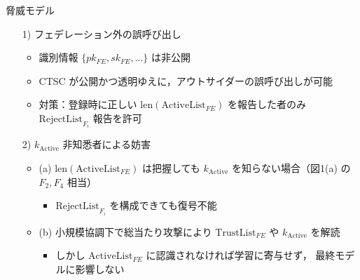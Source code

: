 \documentclass[unicode,12pt,aspectratio=169, dvipdfmx]{beamer}
\begin{document}
  \begin{frame}{脅威モデル}
    \begin{itemize}
      \item[1)] フェデレーション外の誤呼び出し
        \begin{itemize}
          \item 識別情報 \(\{pk_{FE},sk_{FE},\dots\}\) は非公開
          \item CTSC が公開かつ透明ゆえに，アウトサイダーの誤呼び出しが可能
          \item 対策：登録時に正しい \(\mathrm{len}(\mathrm{ActiveList}_{FE})\) を報告した者のみ
            \(\mathrm{RejectList}_{F_i}\) 報告を許可
        \end{itemize}
      \item[2)] \(k_{\mathrm{Active}}\) 非知悉者による妨害
        \begin{itemize}
          \item (a) \(\mathrm{len}(\mathrm{ActiveList}_{FE})\) は把握しても
            \(k_{\mathrm{Active}}\) を知らない場合（図1(a) の \(F_2,F_4\) 相当）
            \begin{itemize}
              \item \(\mathrm{RejectList}_{F_i}\) を構成できても復号不能
            \end{itemize}
          \item (b) 小規模協調下で総当たり攻撃により
            \(\mathrm{TrustList}_{FE}\) や \(k_{\mathrm{Active}}\) を解読
            \begin{itemize}
              \item しかし \(\mathrm{ActiveList}_{FE}\) に認識されなければ学習に寄与せず，
                最終モデルに影響しない
            \end{itemize}
        \end{itemize}
    \end{itemize}
  \end{frame}
  
\end{document}
